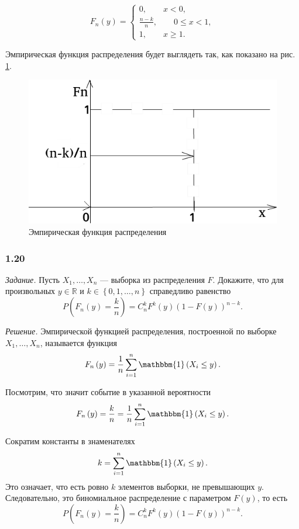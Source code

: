 $$F_n \left( y \right) =
  \begin{cases}
    0, \qquad x < 0, \\
    \frac{n - k}{n}, \qquad 0 \leq x < 1, \\
    1, \qquad x \geq 1.
\end{cases}$$

Эмпирическая функция распределения будет выглядеть так, как показано на рис. \ref{fig:119}.

\begin{figure}[h!]
  \centering
  \includegraphics[width=.4\textwidth]{./pictures/1_19.png}
  \caption{Эмпирическая функция распределения}
  \label{fig:119}
\end{figure}

\subsubsection*{1.20}

\textit{Задание.} Пусть $X_1, \dotsc, X_n$ --- выборка из распределения $F$.
Докажите,
что для произвольных $y \in \mathbb{R}$ и $k \in \left\{ 0, 1, \dotsc, n \right\} $
справедливо равенство
$$P \left( F_n \left( y \right) = \frac{k}{n} \right) =
  C_n^k F^k \left( y \right) \left( 1 - F \left( y \right) \right)^{n - k}.$$

\textit{Решение.} Эмпирической функцией распределения, построенной по выборке $X_1, \dotsc, X_n$,
называется функция
$$F_n \left( y \right) =
  \frac{1}{n} \sum \limits_{i = 1}^n \mathbbm{1} \left( X_i \leq y \right).$$

Посмотрим, что значит событие в указанной вероятности
$$F_n \left( y \right) =
  \frac{k}{n} =
  \frac{1}{n} \sum \limits_{i = 1}^n \mathbbm{1} \left( X_i \leq y \right).$$

Сократим константы в знаменателях
$$k =
  \sum \limits_{i = 1}^n \mathbbm{1} \left( X_i \leq y \right).$$
Это означает, что есть ровно $k$ элементов выборки, не превышающих $y$.
Следовательно, это биномиальное распределение с параметром $F \left( y \right) $, то есть
$$P \left( F_n \left( y \right) = \frac{k}{n} \right) =
  C_n^k F^k \left( y \right) \left( 1 - F \left( y \right) \right)^{n - k}.$$

